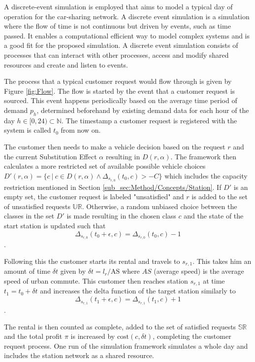 A discrete-event simulation is employed that aims to model a typical day of operation
for the car-sharing network. A discrete event simulation is a simulation where the flow of time is not continuous but driven
by events, such as time passed. It enables a computational efficient way to model complex systems and is a good fit for the
proposed simulation. A discrete event simulation consists of processes that can interact with other processes, access and modify
shared resources and create and listen to events.

The process that a typical customer request would flow through is given by Figure \ref{fig:Flow}. The flow is started by the
event that a customer request is sourced. This event happens periodically based on the average time period of demand $p_h$, determined
beforehand by existing demand data for each hour of the day $h \in [0,24) \subset \mathbb{N}$. The timestamp a customer request is registered with the system
is called $t_0$ from now on.

The customer then needs to make a vehicle decision based on the request $r$ and the current Substitution Effect
 $\alpha$ resulting in $D(r, \alpha)$. The framework then calculates a more restricted set of available
possible vehicle choices $D'(r, \alpha) = \{c \ |\ c \in D(r, \alpha) \land \Delta_{s_{r, 0}}(t_0, c) > -C\}$ which
includes the capacity restriction mentioned in Section \ref{sub_sec:Method/Concepts/Station}. If $D'$ is an empty set, the customer
request is labeled "unsatisfied" and $r$ is added to the set of unsatisfied requests $\mathbb{UR}$. Otherwise, a random unbiased choice between the classes in 
the set $D'$ is made resulting in the chosen class $c$ and the state of the start station is updated such that 
$$
\Delta_{s_{r, 0}}(t_0 + \epsilon, c) = \Delta_{s_{r, 0}}(t_0, c) - 1
$$.
 
Following this the customer starts its rental and travels to $s_{r, 1}$. This takes him an amount of time $\delta t$ given by 
$\delta t = l_r / \text{AS}$ where $AS$ (average speed) is the average speed of urban commute. This customer then reaches
station $s_{r, 1}$ at time $t_1 = t_0 + \delta t$ and increases the delta function of the target station similarly to
$$
\Delta_{s_{r, 1}}(t_1 + \epsilon, c) = \Delta_{s_{r, 1}}(t_1, c) + 1
$$.

The rental is then counted as complete, added to the set of satisfied requests $\mathbb{SR}$ and the total profit $\pi$ is increased by $\text{cost}(c, \delta t)$, completing the
customer request process. One run of the simulation framework simulates a whole day and includes the station network
as a shared resource.


